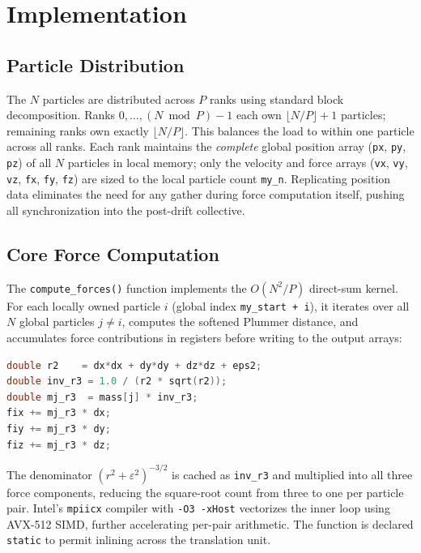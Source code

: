 \documentclass[11pt]{article}
\begin{document}
\section{Implementation}

\subsection{Particle Distribution}

The $N$ particles are distributed across $P$ ranks using standard block decomposition. Ranks $0, \ldots, (N \bmod P) - 1$ each own $\lfloor N/P \rfloor + 1$ particles; remaining ranks own exactly $\lfloor N/P \rfloor$. This balances the load to within one particle across all ranks. Each rank maintains the \emph{complete} global position array (\texttt{px}, \texttt{py}, \texttt{pz}) of all $N$ particles in local memory; only the velocity and force arrays (\texttt{vx}, \texttt{vy}, \texttt{vz}, \texttt{fx}, \texttt{fy}, \texttt{fz}) are sized to the local particle count \texttt{my\_n}. Replicating position data eliminates the need for any gather during force computation itself, pushing all synchronization into the post-drift collective.

\subsection{Core Force Computation}

The \texttt{compute\_forces()} function implements the $O(N^2/P)$ direct-sum kernel. For each locally owned particle $i$ (global index \texttt{my\_start + i}), it iterates over all $N$ global particles $j \neq i$, computes the softened Plummer distance, and accumulates force contributions in registers before writing to the output arrays:

\begin{lstlisting}[language=C, caption={Softened gravitational force inner loop (\texttt{compute\_forces()} in \texttt{nbody.c}).}]
double r2    = dx*dx + dy*dy + dz*dz + eps2;
double inv_r3 = 1.0 / (r2 * sqrt(r2));
double mj_r3  = mass[j] * inv_r3;
fix += mj_r3 * dx;
fiy += mj_r3 * dy;
fiz += mj_r3 * dz;
\end{lstlisting}

The denominator $(r^2 + \varepsilon^2)^{-3/2}$ is cached as \texttt{inv\_r3} and multiplied into all three force components, reducing the square-root count from three to one per particle pair. Intel's \texttt{mpiicx} compiler with \texttt{-O3 -xHost} vectorizes the inner loop using AVX-512 SIMD, further accelerating per-pair arithmetic. The function is declared \texttt{static} to permit inlining across the translation unit.
\end{document}
